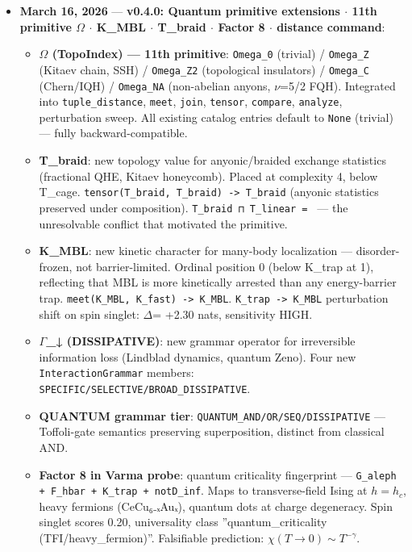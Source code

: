 \documentclass[12pt,a4paper]{article}
\begin{document}
\begin{itemize}
    \item 
    \textbf{March 16, 2026} --- \textbf{v0.4.0: Quantum primitive extensions $\cdot$ 11th primitive $\Omega$ $\cdot$ K\_MBL $\cdot$ T\_braid $\cdot$ Factor 8 $\cdot$ distance command}:

    \begin{itemize}
    \item \textbf{$\Omega$ (TopoIndex) --- 11th primitive}: \texttt{Omega\_0} (trivial) / \texttt{Omega\_Z} (Kitaev chain, SSH) / \texttt{Omega\_Z2} (topological insulators) / \texttt{Omega\_C} (Chern/IQH) / \texttt{Omega\_NA} (non-abelian anyons, $\nu$=5/2 FQH). Integrated into \texttt{tuple\_distance}, \texttt{meet}, \texttt{join}, \texttt{tensor}, \texttt{compare}, \texttt{analyze}, perturbation sweep. All existing catalog entries default to \texttt{None} (trivial) --- fully backward-compatible.
    \item \textbf{T\_braid}: new topology value for anyonic/braided exchange statistics (fractional QHE, Kitaev honeycomb). Placed at complexity 4, below T\_cage. \texttt{tensor(T\_braid, T\_braid) -\textgreater{} T\_braid} (anyonic statistics preserved under composition). \texttt{T\_braid ⊓ T\_linear = \perp} --- the unresolvable conflict that motivated the primitive.
    \item \textbf{K\_MBL}: new kinetic character for many-body localization --- disorder-frozen, not barrier-limited. Ordinal position 0 (below K\_trap at 1), reflecting that MBL is more kinetically arrested than any energy-barrier trap. \texttt{meet(K\_MBL, K\_fast) -\textgreater{} K\_MBL}. \texttt{K\_trap -\textgreater{} K\_MBL} perturbation shift on spin singlet: $\Delta$\xi = +2.30 nats, sensitivity HIGH.
    \item \textbf{$\Gamma$\_↓ (DISSIPATIVE)}: new grammar operator for irreversible information loss (Lindblad dynamics, quantum Zeno). Four new \texttt{InteractionGrammar} members: \texttt{SPECIFIC/SELECTIVE/BROAD\_DISSIPATIVE}.
    \item \textbf{QUANTUM grammar tier}: \texttt{QUANTUM\_AND/OR/SEQ/DISSIPATIVE} --- Toffoli-gate semantics preserving superposition, distinct from classical AND.
    \item \textbf{Factor 8 in Varma probe}: quantum criticality fingerprint --- \texttt{G\_aleph + F\_hbar + K\_trap + notD\_inf}. Maps to transverse-field Ising at $h=h_c$, heavy fermions (CeCu₆₋ₓAuₓ), quantum dots at charge degeneracy. Spin singlet scores 0.20, universality class ''quantum\_criticality (TFI/heavy\_fermion)''. Falsifiable prediction: $\chi(T→0) \sim T^{-\gamma}$.

\end{itemize}
\end{itemize}
\end{document}
